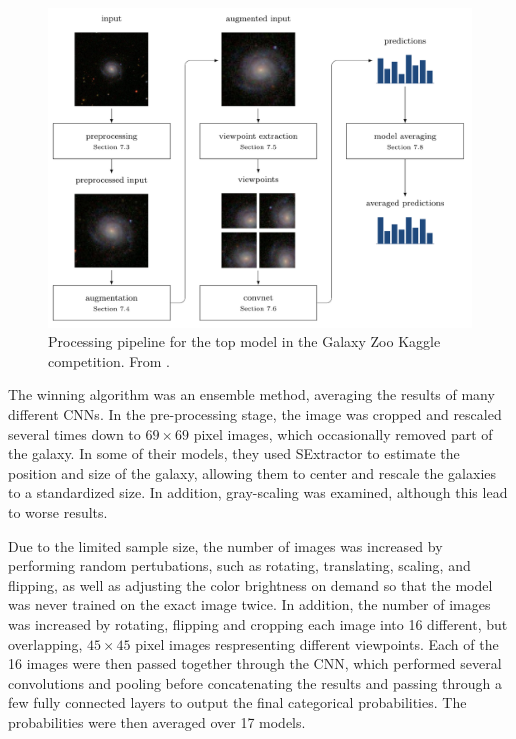 \documentclass{article}
\begin{document}
\begin{figure}[h]
  \centering
	\includegraphics[width=130mm]{../img/GZ2_network.png}
  \caption{Processing pipeline for the top model in the Galaxy Zoo Kaggle competition. From \cite{2015MNRAS.450.1441D}.}
  \label{fig:GZ2_network}
\end{figure}


The winning algorithm was an ensemble method, averaging the results of many different CNNs. In the pre-processing stage, the image was cropped and rescaled several times down to $69 \times 69$ pixel images, which occasionally removed part of the galaxy. In some of their models, they used SExtractor to estimate the position and size of the galaxy, allowing them to center and rescale the galaxies to a standardized size. In addition, gray-scaling was examined, although this lead to worse results.

Due to the limited sample size, the number of images was increased by performing random pertubations, such as rotating, translating, scaling, and flipping, as well as adjusting the color brightness on demand so that the model was never trained on the exact image twice. In addition, the number of images was increased by rotating, flipping and cropping each image into 16 different, but overlapping, $45 \times 45$ pixel images respresenting different viewpoints. Each of the 16 images were then passed together through the CNN, which performed several convolutions and pooling before concatenating the results and passing through a few fully connected layers to output the final categorical probabilities. The probabilities were then averaged over 17 models.
\end{document}
